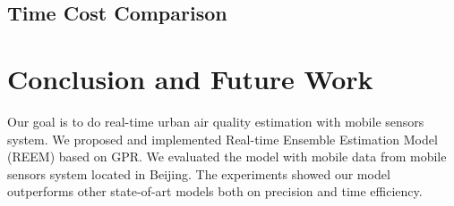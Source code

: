 \documentclass[twoside,leqno,twocolumn]{article}
\begin{document}
\subsection{Time Cost Comparison}
%
%
\section{Conclusion and Future Work}
Our goal is to do real-time urban air quality estimation with mobile sensors system. We proposed and implemented Real-time Ensemble Estimation Model (REEM) based on GPR. We evaluated the model with mobile data from mobile sensors system located in Beijing. The experiments showed our model outperforms other state-of-art models both on precision and time efficiency.
\end{document}
